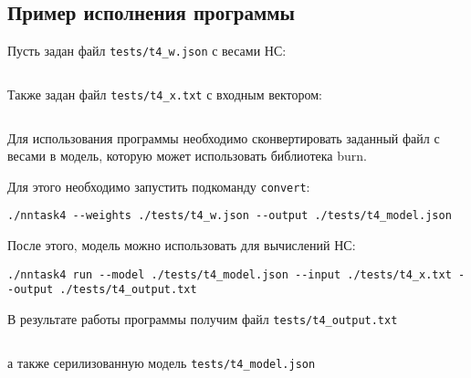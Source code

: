 \documentclass[spec, och, labwork]{SCWorks}
\begin{document}
\subsection*{Пример исполнения программы}

Пусть задан файл \verb|tests/t4_w.json| с весами НС:
\inputminted{xml}{../tests/t4_w.json}

Также задан файл \verb|tests/t4_x.txt| с входным вектором:
\inputminted{json}{../tests/t4_x.txt}

Для использования программы необходимо сконвертировать заданный файл с весами в
модель, которую может использовать библиотека burn.

Для этого необходимо запустить подкоманду \texttt{convert}:
\begin{verbatim}
./nntask4 --weights ./tests/t4_w.json --output ./tests/t4_model.json
\end{verbatim}

После этого, модель можно использовать для вычислений НС:
\begin{verbatim}
./nntask4 run --model ./tests/t4_model.json --input ./tests/t4_x.txt --output ./tests/t4_output.txt
\end{verbatim}

В результате работы программы получим файл \verb|tests/t4_output.txt|
\inputminted{xml}{../tests/t4_output.txt}
а также серилизованную модель \verb|tests/t4_model.json|
\inputminted{xml}{../tests/t4_model.json}
\end{document}
